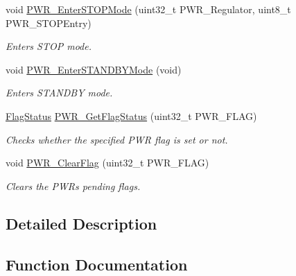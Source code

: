 \begin{DoxyCompactItemize}
void \hyperlink{group___p_w_r___exported___functions_ga694676ac06a9baf50eae45adae0118ab}{P\+W\+R\+\_\+\+Enter\+S\+T\+O\+P\+Mode} (uint32\+\_\+t P\+W\+R\+\_\+\+Regulator, uint8\+\_\+t P\+W\+R\+\_\+\+S\+T\+O\+P\+Entry)
\begin{DoxyCompactList}\small\item\em Enters S\+T\+OP mode. \end{DoxyCompactList}\item 
void \hyperlink{group___p_w_r___exported___functions_ga00ddae00a9c327b81b24d2597b0052f3}{P\+W\+R\+\_\+\+Enter\+S\+T\+A\+N\+D\+B\+Y\+Mode} (void)
\begin{DoxyCompactList}\small\item\em Enters S\+T\+A\+N\+D\+BY mode. \end{DoxyCompactList}\item 
\hyperlink{group___exported__types_ga89136caac2e14c55151f527ac02daaff}{Flag\+Status} \hyperlink{group___p_w_r___exported___functions_gaa980163a4d83304280ee34942464b4ec}{P\+W\+R\+\_\+\+Get\+Flag\+Status} (uint32\+\_\+t P\+W\+R\+\_\+\+F\+L\+AG)
\begin{DoxyCompactList}\small\item\em Checks whether the specified P\+WR flag is set or not. \end{DoxyCompactList}\item 
void \hyperlink{group___p_w_r___exported___functions_ga01c4b2fbd16514b993324e101c3ddf7c}{P\+W\+R\+\_\+\+Clear\+Flag} (uint32\+\_\+t P\+W\+R\+\_\+\+F\+L\+AG)
\begin{DoxyCompactList}\small\item\em Clears the P\+WR\textquotesingle{}s pending flags. \end{DoxyCompactList}\end{DoxyCompactItemize}


\subsection{Detailed Description}


\subsection{Function Documentation}
\mbox{\label{group___p_w_r___exported___functions_ga0741aea35572b1a75f82b74de12df800}} 
